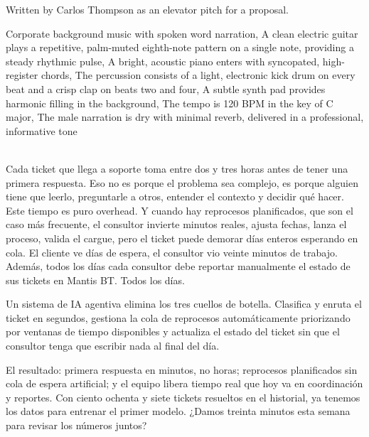 
\begin{notes}
Written by Carlos Thompson as an elevator pitch for a proposal.
\end{notes}
\begin{style}
Corporate background music with spoken word narration, A clean electric guitar plays a repetitive, palm-muted eighth-note pattern on a single note, providing a steady rhythmic pulse, A bright, acoustic piano enters with syncopated, high-register chords, The percussion consists of a light, electronic kick drum on every beat and a crisp clap on beats two and four, A subtle synth pad provides harmonic filling in the background, The tempo is 120 BPM in the key of C major, The male narration is dry with minimal reverb, delivered in a professional, informative tone
\end{style}
\begin{lyrics}

\\
Cada ticket que llega a soporte toma entre dos y tres horas antes de tener una primera respuesta.  Eso no es porque el problema sea complejo, es porque alguien tiene que leerlo, preguntarle a otros, entender el contexto y decidir qué hacer. Este tiempo es puro overhead. Y cuando hay reprocesos planificados, que son el caso más frecuente, el consultor invierte minutos reales, ajusta fechas, lanza el proceso, valida el cargue, pero el ticket puede demorar días enteros esperando en cola. El cliente ve días de espera, el consultor vio veinte minutos de trabajo. Además, todos los días cada consultor debe reportar manualmente el estado de sus tickets en Mantis BT. Todos los días.

Un sistema de IA agentiva elimina los tres cuellos de botella. Clasifica y enruta el ticket en segundos, gestiona la cola de reprocesos automáticamente priorizando por ventanas de tiempo disponibles y actualiza el estado del ticket sin que el consultor tenga que escribir nada al final del día.

El resultado: primera respuesta en minutos, no horas; reprocesos planificados sin cola de espera artificial; y el equipo libera tiempo real que hoy va en coordinación y reportes. Con ciento ochenta y siete tickets resueltos en el historial, ya tenemos los datos para entrenar el primer modelo. ¿Damos treinta minutos esta semana para revisar los números juntos?
\end{lyrics}

